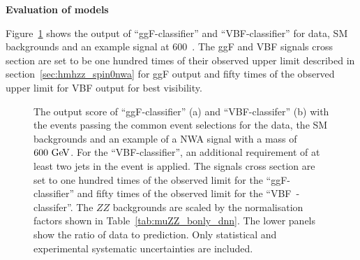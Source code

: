 \textbf{Evaluation of models} 

Figure~\ref{fig:dnn_output_score} shows the output of ``ggF-classifier'' and ``VBF-classifier'' for data, SM backgrounds and an example signal at 600~\gev.
The ggF and VBF signals cross section are set to be one hundred times of their observed upper limit described in section~\ref{sec:hmhzz_spin0nwa} for ggF output
and fifty times of the observed upper limit for VBF output for best visibility.

\begin{figure}[htbp]
        \centering
        \caption{The output score of ``ggF-classifier'' (a) and  ``VBF-classifer'' (b) with the events passing the common event selections  
        for the data, the SM backgrounds and an example of a NWA signal with a mass of $600~\text{Ge\kern -0.1em V}{}$.
        For the ``VBF-classifier'', an additional requirement of at least two jets in the event is applied.
        The signals cross section are set to one hundred times of the observed limit for the ``ggF-classifier'' 
        and fifty times of the observed limit for the ``VBF~-classifer''.
        The $ZZ$ backgrounds are scaled by the normalisation factors shown in Table~\ref{tab:muZZ_bonly_dnn}.
        The lower panels show the ratio of data to prediction.
        Only statistical and experimental systematic uncertainties are included.}
        \label{fig:dnn_output_score}
\end{figure}

